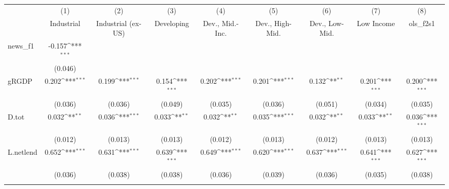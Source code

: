 {
\def\sym#1{\ifmmode^{#1}\else\(^{#1}\)\fi}
\begin{tabular}{l*{8}{c}}
\toprule
            &\multicolumn{1}{c}{(1)}&\multicolumn{1}{c}{(2)}&\multicolumn{1}{c}{(3)}&\multicolumn{1}{c}{(4)}&\multicolumn{1}{c}{(5)}&\multicolumn{1}{c}{(6)}&\multicolumn{1}{c}{(7)}&\multicolumn{1}{c}{(8)}\\
            &\multicolumn{1}{c}{Industrial}&\multicolumn{1}{c}{Industrial (ex-US)}&\multicolumn{1}{c}{Developing}&\multicolumn{1}{c}{Dev., Mid.-Inc.}&\multicolumn{1}{c}{Dev., High-Mid.}&\multicolumn{1}{c}{Dev., Low-Mid.}&\multicolumn{1}{c}{Low Income}&\multicolumn{1}{c}{ols\_f2s1}\\
\midrule
news\_f1     &      -0.157\sym{***}&                     &                     &                     &                     &                     &                     &                     \\
            &     (0.046)         &                     &                     &                     &                     &                     &                     &                     \\
\addlinespace
gRGDP       &       0.202\sym{***}&       0.199\sym{***}&       0.154\sym{***}&       0.202\sym{***}&       0.201\sym{***}&       0.132\sym{**} &       0.201\sym{***}&       0.200\sym{***}\\
            &     (0.036)         &     (0.036)         &     (0.049)         &     (0.035)         &     (0.036)         &     (0.051)         &     (0.034)         &     (0.035)         \\
\addlinespace
D.tot       &       0.032\sym{**} &       0.036\sym{***}&       0.033\sym{**} &       0.032\sym{**} &       0.035\sym{***}&       0.032\sym{**} &       0.033\sym{**} &       0.036\sym{***}\\
            &     (0.012)         &     (0.013)         &     (0.013)         &     (0.012)         &     (0.013)         &     (0.012)         &     (0.013)         &     (0.013)         \\
\addlinespace
L.netlend   &       0.652\sym{***}&       0.631\sym{***}&       0.639\sym{***}&       0.649\sym{***}&       0.620\sym{***}&       0.637\sym{***}&       0.641\sym{***}&       0.627\sym{***}\\
            &     (0.036)         &     (0.038)         &     (0.038)         &     (0.036)         &     (0.039)         &     (0.036)         &     (0.035)         &     (0.038)         \\
\addlinespace

\end{tabular}}
